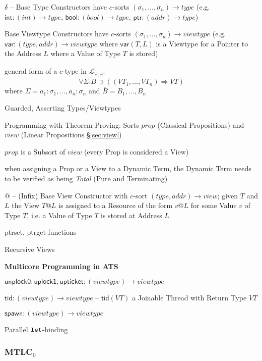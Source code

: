 $\delta$ -- Base Type Constructors have $c$-sorts $(\sigma_1, \ldots,
\sigma_n) \rightarrow type$ (e.g. $\mathsf{int} : (int) \rightarrow
type$, $\mathsf{bool} : (bool) \rightarrow type$, $\mathsf{ptr} :
(addr) \rightarrow type$)

Base Viewtype Constructors have $c$-sorts $(\sigma_1, \ldots,
\sigma_n) \rightarrow viewtype$ (e.g. $\mathsf{var} : (type, addr)
\rightarrow viewtype$ where $\mathsf{var}(T,L)$ is a Viewtype for a
Pointer to the Address $L$ where a Value of Type $T$ is stored)

general form of a $c$-type in $\mathcal{L}^\parallel_{\forall,
  \exists}$:
\[
  \forall\Sigma.\overline{B}
    \supset ((VT_1, \ldots, VT_n) \Rightarrow VT)
\]
where $\Sigma = a_1 : \sigma_1, \ldots, a_n : \sigma_n$ and
$\overline{B} = B_1, \ldots, B_n$

Guarded, Asserting Types/Viewtypes %

Programming with Theorem Proving: Sorts $prop$ (Classical
Propositions) and $view$ (Linear Propositions \S\ref{sec:view})

$prop$ is a Subsort of $view$ (every Prop is considered a View)

when assigning a Prop or a View to a Dynamic Term, the Dynamic Term
needs to be verified as being \emph{Total} (Pure and Terminating)

$@$ -- (Infix) Base View Constructor with $c$-sort $(type, addr)
\rightarrow view$; given $T$ and $L$ the View $T@L$ is assigned to a
Resource of the form $v@L$ for some Value $v$ of Type $T$, i.e. a
Value of Type $T$ is stored at Address $L$

ptrset, ptrget functions %

Recursive Views


\textbf{Multicore Programming in ATS}

$\mathsf{unplock0, uplock1, upticket} : (viewtype) \rightarrow
viewtype$

$\mathsf{tid} : (viewtype) \rightarrow viewtype$ -- $\mathsf{tid}(VT)$
a Joinable Thread with Return Type $VT$

$\mathsf{spawn} : (viewtype) \rightarrow viewtype$

Parallel $\mathtt{let}$-binding %



\subsubsection{MTLC$_0$}\label{sec:mtlc_0}

